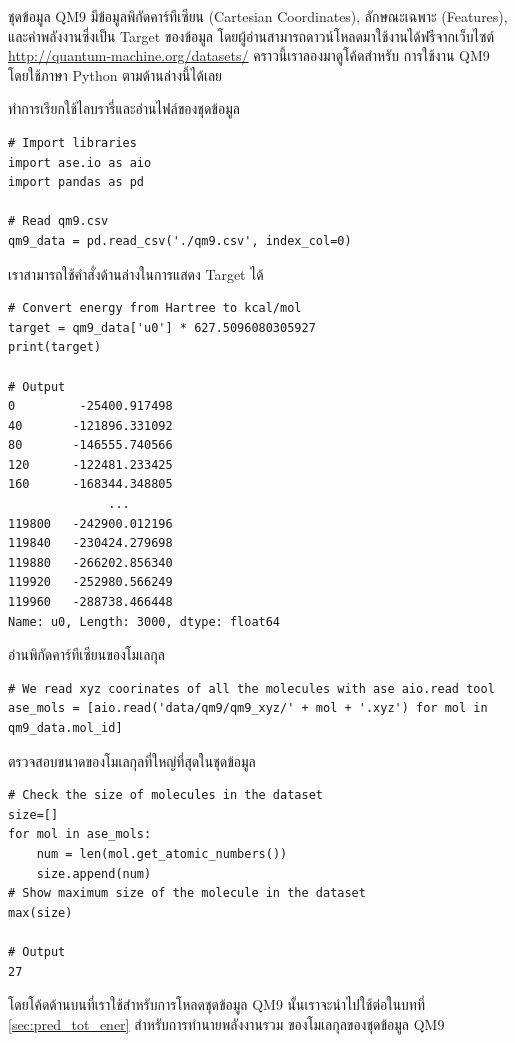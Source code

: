 ชุดข้อมูล QM9 มีข้อมูลพิกัดคาร์ทีเซียน (Cartesian Coordinates), ลักษณะเฉพาะ (Features), และค่าพลังงานซึ่งเป็น Target ของข้อมูล 
โดยผู้อ่านสามารถดาวน์โหลดมาใช้งานได้ฟรีจากเว็บไซต์ \url{http://quantum-machine.org/datasets/} คราวนี้เราลองมาดูโค้ดสำหรับ%
การใช้งาน QM9 โดยใช้ภาษา Python ตามด้านล่างนี้ได้เลย

\noindent ทำการเรียกใช้ไลบรารี่และอ่านไฟล์ของชุดข้อมูล

\begin{lstlisting}[style=MyPython]
# Import libraries
import ase.io as aio
import pandas as pd

# Read qm9.csv
qm9_data = pd.read_csv('./qm9.csv', index_col=0)
\end{lstlisting}

\vspace{1em}
\noindent เราสามารถใช้คำสั่งด้านล่างในการแสดง Target ได้

\begin{lstlisting}[style=MyPython]
# Convert energy from Hartree to kcal/mol
target = qm9_data['u0'] * 627.5096080305927 
print(target)

# Output
0         -25400.917498
40       -121896.331092
80       -146555.740566
120      -122481.233425
160      -168344.348805
              ...      
119800   -242900.012196
119840   -230424.279698
119880   -266202.856340
119920   -252980.566249
119960   -288738.466448
Name: u0, Length: 3000, dtype: float64
\end{lstlisting}

\vspace{1em}
\noindent อ่านพิกัดคาร์ทีเซียนของโมเลกุล

\begin{lstlisting}[style=MyPython]
# We read xyz coorinates of all the molecules with ase aio.read tool
ase_mols = [aio.read('data/qm9/qm9_xyz/' + mol + '.xyz') for mol in qm9_data.mol_id]
\end{lstlisting}

\vspace{1em}
\noindent ตรวจสอบขนาดของโมเลกุลที่ใหญ่ที่สุดในชุดข้อมูล

\begin{lstlisting}[style=MyPython]
# Check the size of molecules in the dataset
size=[]
for mol in ase_mols:
    num = len(mol.get_atomic_numbers())
    size.append(num)
# Show maximum size of the molecule in the dataset
max(size)

# Output
27
\end{lstlisting}

\vspace{1em}
โดยโค้ดด้านบนที่เราใช้สำหรับการโหลดชุดข้อมูล QM9 นั้นเราจะนำไปใช้ต่อในบทที่ \ref{sec:pred_tot_ener} สำหรับการทำนายพลังงานรวม%
ของโมเลกุลของชุดข้อมูล QM9

